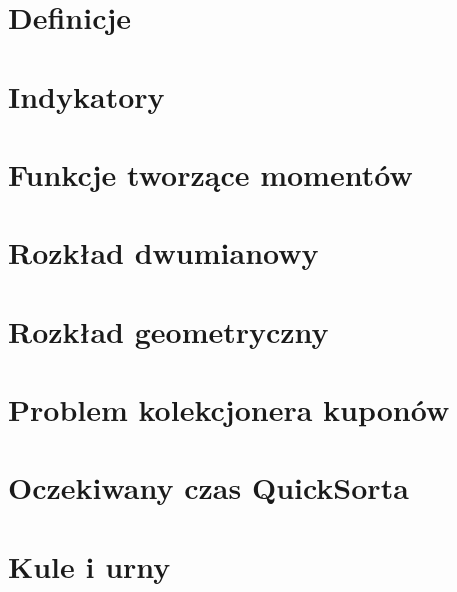 \section{Definicje}


\section{Indykatory}


\section{Funkcje tworzące momentów}


\newpage
\section{Rozkład dwumianowy}


\newpage
\section{Rozkład geometryczny}


\newpage
\section{Problem kolekcjonera kuponów}
\label{coupon-collectors-problem}


\newpage
\section{Oczekiwany czas QuickSorta}


\newpage
\section{Kule i urny}

